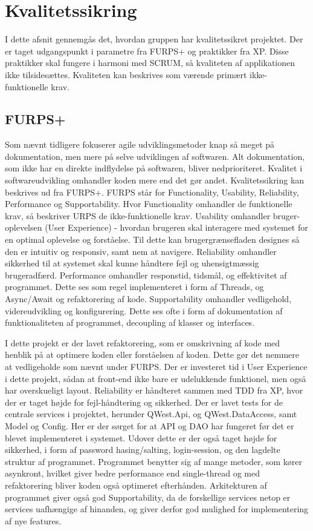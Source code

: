 \chapter{Kvalitetssikring}\label{ch:Kvalitetssikring}

I dette afsnit gennemgås det, hvordan gruppen har kvalitetssikret projektet. Der er taget udgangspunkt i parametre fra FURPS+ og praktikker fra XP. Disse praktikker skal fungere i harmoni med SCRUM, så kvaliteten af applikationen ikke tilsidesættes. Kvaliteten kan beskrives som værende primært ikke-funktionelle krav.

\section{FURPS+}
Som nævnt tidligere fokuserer agile udviklingsmetoder knap så meget på dokumentation, men mere på selve udviklingen af softwaren. Alt dokumentation, som ikke har en direkte indflydelse på softwaren, bliver nedprioriteret. Kvalitet i softwareudvikling omhandler koden mere end det gør andet. Kvalitetssikring kan beskrives ud fra FURPS+\cite{furps}. FURPS står for Functionality, Usability, Reliability, Performance og Supportability. Hvor Functionality omhandler de funktionelle krav, så beskriver URPS de ikke-funktionelle krav. 
Usability omhandler bruger-oplevelsen (User Experience) - hvordan brugeren skal interagere med systemet for en optimal oplevelse og forståelse. Til dette kan brugergrænsefladen designes så den er intuitiv og responsiv, samt nem at navigere. 
Reliability omhandler sikkerhed til at systemet skal kunne håndtere fejl og uhensigtmæssig brugeradfærd.
Performance omhandler responstid, tidsmål, og effektivitet af programmet. Dette ses som regel implementeret i form af Threads, og Async/Await og refaktorering af kode.
Supportability omhandler vedligehold, videreudvikling og konfigurering. Dette ses ofte i form af dokumentation af funktionaliteten af programmet, decoupling af klasser og interfaces.

I dette projekt er der lavet refaktorering, som er omskrivning af kode med henblik på at optimere koden eller forståelsen af koden. Dette gør det nemmere at vedligeholde som nævnt under FURPS. 
Der er investeret tid i User Experience i dette projekt, sådan at front-end ikke bare er udelukkende funktionel, men også har overskueligt layout. Reliability er håndteret sammen med TDD fra XP, hvor der er taget højde for fejl-håndtering og sikkerhed. Der er lavet tests for de centrale services i projektet, herunder QWest.Api, og QWest.DataAccess, samt Model og Config. Her er der sørget for at API og DAO har fungeret før det er blevet implementeret i systemet. Udover dette er der også taget højde for sikkerhed, i form af password hasing/salting, login-session, og den lagdelte struktur af programmet.
Programmet benytter sig af mange metoder, som kører asynkront, hvilket giver bedre performance end single-thread og med refaktorering bliver koden også optimeret efterhånden. Arkitekturen af programmet giver også god Supportability, da de forskellige services netop er services uafhængige af hinanden, og giver derfor god mulighed for implementering af nye features.

